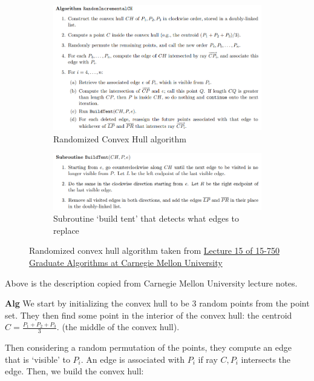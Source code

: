 \documentclass[11pt]{article}
\begin{document}
\begin{figure}[h]
    \centering
    \begin{subfigure}{0.7 \textwidth}
        \includegraphics[width = \textwidth]{randomized_CH.png}
        \caption{Randomized Convex Hull algorithm}
    \end{subfigure}
    \begin{subfigure}{0.7 \textwidth}
        \includegraphics[width = \textwidth]{buildTent.png}
        \caption{Subroutine `build tent' that detects what edges to replace}
    \end{subfigure}
    \caption{Randomized convex hull algorithm taken from 
    \href{http://www.cs.cmu.edu/afs/cs/academic/class/15750-s17/ScribeNotes/Lecture15/lecture15.pdf}{Lecture 15 of 15-750 Graduate Algorithms at Carnegie Mellon University}}
\end{figure}

Above is the description copied from Carnegie Mellon University lecture notes.

\textbf{Alg}
We start by initializing the convex hull to be 3 random points from the point set.
They then find some point in the interior of the convex hull: the centroid $C = \frac{P_1 + P_2 + P_3}{3}$.
(the middle of the convex hull).

Then considering a random permutation of the points, they compute an edge that is `visible' to $P_i$.
An edge is associated with $P_i$ if ray $C, P_i$ intersects the edge. 
Then, we build the convex hull:
\end{document}

